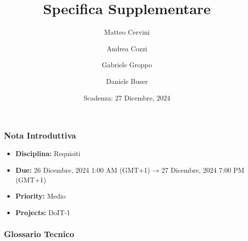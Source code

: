 \title{Specifica Supplementare}
\author{Matteo Cervini \and Andrea Cozzi \and Gabriele Groppo \and Daniele Buser}
\date{Scadenza: 27 Dicembre, 2024}

\maketitle

\subsubsection{Nota Introduttiva}
\begin{itemize}
\item \textbf{Disciplina:} Requisiti
\item \textbf{Due:} 26 Dicembre, 2024 1:00 AM (GMT+1) → 27 Dicembre, 2024 7:00 PM (GMT+1)
\item \textbf{Priority:} Medio
\item \textbf{Projects:} DoIT-1
\end{itemize}

\subsubsection{Glossario Tecnico}

